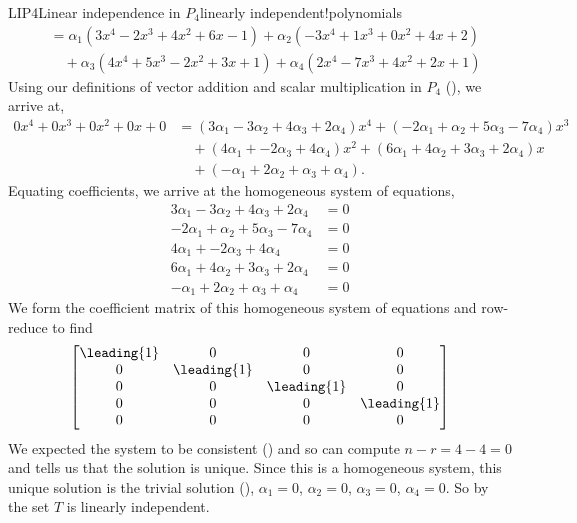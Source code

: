 \begin{example}{LIP4}{Linear independence in $P_4$}{linearly independent!polynomials}
\begin{align*}
%
&=\alpha_1\left(3x^4-2x^3+4x^2+6x-1\right)+\alpha_2\left(-3x^4+1x^3+0x^2+4x+2\right)\\
&\quad +\alpha_3\left(4x^4+5x^3-2x^2+3x+1\right)+\alpha_4\left(2x^4-7x^3+4x^2+2x+1\right)
\end{align*}
%
Using our definitions of vector addition and scalar multiplication in $P_4$ (), we arrive at,
%
\begin{align*}
0x^4+0x^3+0x^2+0x+0&=
\left(3\alpha_1-3\alpha_2+4\alpha_3+2\alpha_4\right)x^4+ 
\left(-2\alpha_1+\alpha_2+5\alpha_3-7\alpha_4\right)x^3\\
&\quad + 
\left(4\alpha_1+              -2\alpha_3+4\alpha_4\right)x^2+
\left(6\alpha_1+4\alpha_2+3\alpha_3+2\alpha_4\right)x\\ 
&\quad + 
\left(-\alpha_1+2\alpha_2+\alpha_3+\alpha_4\right).
\end{align*}
%
Equating coefficients, we arrive at the homogeneous system of equations,
%
\begin{align*}
3\alpha_1-3\alpha_2+4\alpha_3+2\alpha_4&=0\\
-2\alpha_1+\alpha_2+5\alpha_3-7\alpha_4&=0\\
4\alpha_1+              -2\alpha_3+4\alpha_4&=0\\
6\alpha_1+4\alpha_2+3\alpha_3+2\alpha_4&=0\\
-\alpha_1+2\alpha_2+\alpha_3+\alpha_4&=0
\end{align*}
%
We form the coefficient matrix of this homogeneous system of equations and row-reduce to find
%
\begin{equation*}
\begin{bmatrix}
\leading{1} & 0 & 0 & 0\\ 
0 & \leading{1} & 0 & 0\\ 
0 & 0 & \leading{1} & 0\\ 
0 & 0 & 0 & \leading{1}\\ 
0 & 0 & 0 & 0
\end{bmatrix}
\end{equation*}
%
We expected the system to be consistent () and so can compute $n-r=4-4=0$ and  tells us that the solution is unique.  Since this is a homogeneous system, this unique solution is the trivial solution (),  $\alpha_1=0$, $\alpha_2=0$, $\alpha_3=0$, $\alpha_4=0$.  So by  the set $T$ is linearly independent.\par
%

\end{example}
